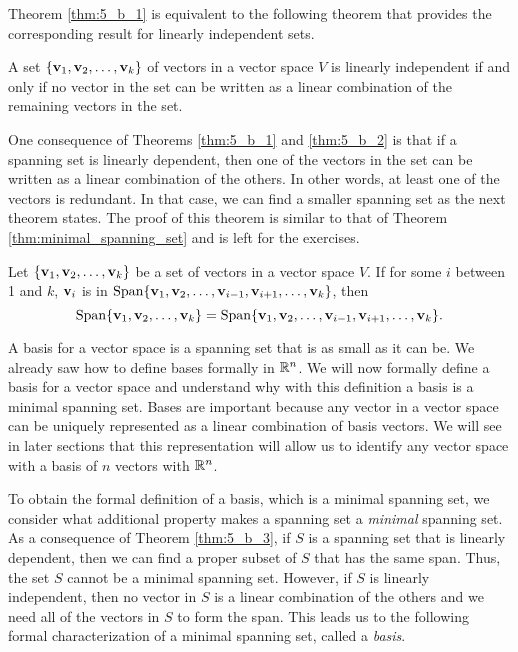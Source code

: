Theorem \ref{thm:5_b_1} is equivalent to the following theorem that provides the corresponding result for linearly independent sets.  

\begin{theorem} \label{thm:5_b_2} A set $\{\mathbf{v}_1, \mathbf{v}_2, \ldots, \mathbf{v}_k\}$ of vectors in a vector space $V$ is linearly independent if and only if no vector in the set can be written as a linear combination of the remaining vectors in the set.
\end{theorem}


One consequence of Theorems \ref{thm:5_b_1} and \ref{thm:5_b_2} is that if a spanning set is linearly dependent, then one of the vectors in the set can be written as a linear combination of the others. In other words, at least one of the vectors is redundant. In that case, we can find a smaller spanning set as the next theorem states. The proof of this theorem is similar to that of Theorem \ref{thm:minimal_spanning_set} and is left for the exercises. 

\begin{theorem} \label{thm:5_b_3} Let $\{\mathbf{v}_1, \mathbf{v}_2, \ldots, \mathbf{v}_k\}$ be a set of vectors in a vector space $V$. If for some $i$ between 1 and $k$, $\mathbf{v}_i$ is in $\text{Span} \{\mathbf{v}_1, \mathbf{v}_2, \ldots, \mathbf{v}_{i-1}, \mathbf{v}_{i+1}, \ldots, \mathbf{v}_k\}$, then
\[\text{Span}\{\mathbf{v}_1, \mathbf{v}_2, \ldots, \mathbf{v}_k\} = \text{Span}\{\mathbf{v}_1, \mathbf{v}_2, \ldots, \mathbf{v}_{i-1}, \mathbf{v}_{i+1}, \ldots, \mathbf{v}_k\}.\]
\end{theorem}



A basis for a vector space is a spanning set that is as small as it can be. We already saw how to define bases formally in $\mathbb{R}^n$. We will now formally define a basis for a vector space and understand why with this definition a basis is a minimal spanning set. Bases are important because any vector in a vector space can be uniquely represented as a linear combination of basis vectors. We will see in later sections that this representation will allow us to identify any vector space with a basis of $n$ vectors with $\mathbb{R}^n$. 


To obtain the formal definition of a basis, which is a minimal spanning set, we consider what additional property makes a spanning set a \emph{minimal} spanning set. As a consequence of Theorem \ref{thm:5_b_3}, if $S$ is a spanning set that is linearly dependent, then we can find a proper subset of $S$ that has the same span. Thus, the set $S$ cannot be a minimal spanning set. However, if $S$ is linearly independent, then no vector in $S$ is a linear combination of the others and we need all of the vectors in $S$ to form the span. This leads us to the following formal characterization of a minimal spanning set, called a \emph{basis}.


